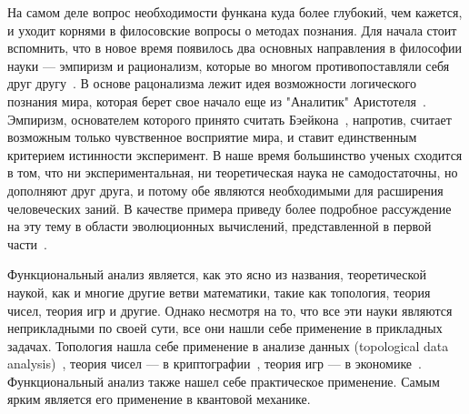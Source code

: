\documentclass[russian]{article}
\begin{document}
На самом деле вопрос необходимости функана куда более глубокий, чем кажется, и уходит корнями в филосовские вопросы о методах познания. Для начала стоит вспомнить, что в новое время появилось два основных направления в философии науки --- эмпиризм и рационализм, которые во многом противопоставляли себя друг другу~\cite{phil}. В основе рацонализма лежит идея возможности логического познания мира, которая берет свое начало еще из "Аналитик" Аристотеля~\cite{aristotel}. Эмпиризм, основателем которого принято считать Бэейкона~\cite{bacon}, напротив, считает возможным только чувственное восприятие мира, и ставит единственным критерием истинности эксперимент. В наше время большинство ученых сходится в том, что ни экспериментальная, ни теоретическая наука не самодостаточны, но дополняют друг друга, и потому обе являются необходимыми для расширения человеческих заний. В качестве примера приведу более подробное рассуждение на эту тему в области эволюционных вычислений, представленной в первой части~\cite{doerr}.

Функциональный анализ является, как это ясно из названия, теоретической наукой, как и многие другие ветви математики, такие как топология, теория чисел, теория игр и другие. Однако несмотря на то, что все эти науки являются неприкладными по своей сути, все они нашли себе применение в прикладных задачах. Топология нашла себе применение в анализе данных (topological data analysis)~\cite{topology}, теория чисел --- в криптографии~\cite{numbers}, теория игр --- в экономике~\cite{games}. Функциональный анализ также нашел себе практическое применение. Самым ярким является его применение в квантовой механике. 



\end{document}
